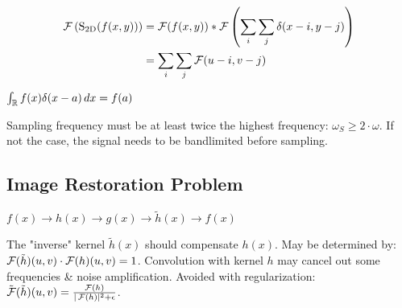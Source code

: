 \begin{definition}
  \begin{align*}
    \operatorname{\mathcal{F}}\left(\operatorname{S}_{2 \mathrm{D}}(f(x, y))\right) & = \operatorname{\mathcal{F}}(f(x, y)) \ast \operatorname{\mathcal{F}}\left(\sum_{i} \sum_{j} \delta(x-i, y-j)\right) \\
    & = \sum_i \sum_j \operatorname{\mathcal{F}}(u - i, v - j)
  \end{align*}
\end{definition}

\begin{definition}
  \(\int_{\operatorname{\mathbb{R}}} f(x) \delta(x - a) \, dx = f(a)\)
\end{definition}

\begin{algorithm}
  Sampling frequency must be at least twice the highest frequency: \(\omega_S \geq 2 \cdot \omega\). If not the case, the signal needs to be bandlimited before sampling.
\end{algorithm}

\subsection{Image Restoration Problem}
\begin{center}
  \(f(x) \to h(x) \to g(x) \to \tilde{h}(x) \to f(x)\)
\end{center}
The "inverse" kernel \(\tilde{h}(x)\) should compensate \(h(x)\). May be determined by: \(\operatorname{\mathcal{F}}(\tilde{h})(u, v) \cdot \operatorname{\mathcal{F}}(h)(u, v) = 1\). Convolution with kernel \(h\) may cancel out some frequencies \& noise amplification. Avoided with regularization: \(\tilde{\operatorname{\mathcal{F}}}(\tilde{h})(u, v) = \frac{\operatorname{\mathcal{F}}(h)}{|\operatorname{\mathcal{F}}(h)|^2 + \epsilon}\).
